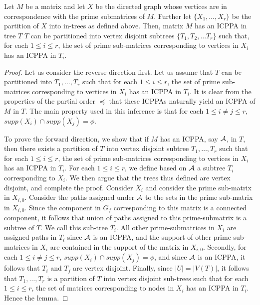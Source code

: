 \begin{lemma}
  \label{lem:subicppa}
  Let $M$ be a matrix and let $X$ be the directed graph whose vertices
  are in correspondence with the prime submatrices of $M$.  Further
  let $\{X_1,\ldots,X_r\}$ be the partition of $X$ into in-trees as
  defined above.  Then, matrix $M$ has an ICPPA in tree $T$ \iff $T$
  can be partitioned into vertex disjoint subtrees $\{T_1, T_2, \dots
  T_r\}$ such that, for each $1 \leq i \leq r$, the set of prime
  sub-matrices corresponding to vertices in $X_i$ has an ICPPA in
  $T_i$.
\end{lemma}
\begin{proof}\thesisspacing
  Let us consider the reverse direction first.  Let us assume that $T$
  can be partitioned into $T_1, \ldots, T_r$ such that for each $1
  \leq i \leq r $, the set of prime sub-matrices corresponding to
  vertices in $X_i$ has an ICPPA in $T_i$.  It is clear from the
  properties of the partial order $\preccurlyeq$ that these ICPPAs
  naturally yield an ICPPA of $M$ in $T$.  The main property used in
  this inference is that for each $1 \leq i \neq j \leq r$, $supp(X_i)
  \cap supp(X_j) = \phi$.

\noindent
To prove the forward direction, we show that if $M$ has an ICPPA, say
${\cal A}$, in $T$, then there exists a partition of $T$ into vertex
disjoint subtree $T_1, \ldots, T_r$ such that for each $1 \leq i \leq
r$, the set of prime sub-matrices corresponding to vertices in $X_i$
has an ICPPA in $T_i$.  For each $1 \leq i \leq r$, we define based on
${\cal A}$ a subtree $T_i$ corresponding to $X_i$.  We then argue that the
trees thus defined are vertex disjoint, and complete the proof.
Consider $X_i$ and consider the prime sub-matrix in $X_{i,0}$.
Consider the paths assigned under ${\cal A}$ to the sets in the prime
sub-matrix in $X_{i,0}$.  Since the component in $G_f$ corresponding
to this matrix is a connected component, it follows that union of
paths assigned to this prime-submatrix is a subtree of $T$.  We call
this sub-tree $T_i$.  All other prime-submatrices in $X_i$ are
assigned paths in $T_i$ since ${\cal A}$ is an ICPPA, and the support of
other prime sub-matrices in $X_i$ are contained in the support of the
matrix in $X_{i,0}$.  Secondly, for each $1 \leq i \neq j \leq r$,
$supp(X_i) \cap supp(X_j) = \phi$, and since ${\cal A}$ is an ICPPA, it
follows that $T_i$ and $T_j$ are vertex disjoint.  Finally, since $|U|
= |V(T)|$, it follows that $T_1, \ldots, T_r$ is a partition of $T$
into vertex disjoint sub-trees such that for each $1 \leq i \leq r$,
the set of matrices corresponding to nodes in $X_i$ has an ICPPA in
$T_i$.  Hence the lemma.
\end{proof}
